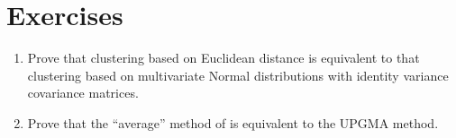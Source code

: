 \section{Exercises}
\label{sec:pairwise_exercise}

\begin{enumerate}[label=\thechapter-\arabic*]

\item
Prove that clustering based on Euclidean distance is equivalent to that
clustering based on multivariate Normal distributions with identity variance
covariance matrices.

\item
Prove that the ``average'' method of  is equivalent to the
UPGMA method.

\end{enumerate}

